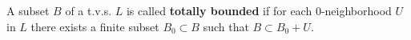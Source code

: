 A subset $B$ of a t.v.s. $L$ is called \textbf{totally bounded} if for each $0$-neighborhood $U$ in $L$ there exists a finite subset $B_0 \subset B$ such that $B \subset B_0 + U$.
